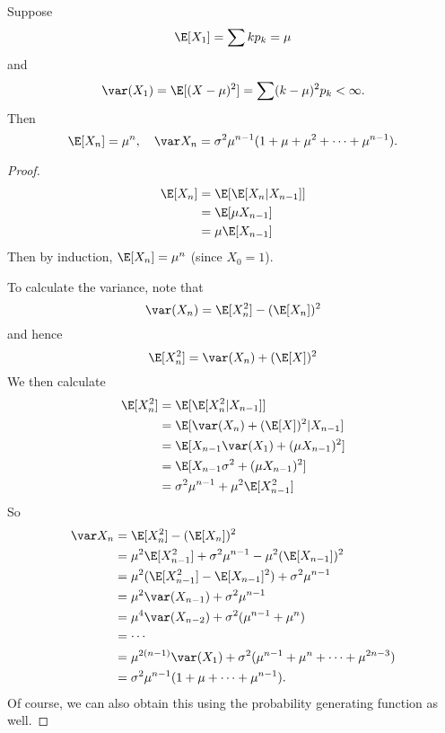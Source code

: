 \documentclass[a4paper]{article}
\begin{document}
\begin{thm}
  Suppose
  \[
    \E[X_1] = \sum k p_k = \mu
  \]
  and
  \[
    \var (X_1) = \E[(X - \mu)^2] = \sum (k - \mu)^2 p_k < \infty.
  \]
  Then
  \[
    \E[X_n] = \mu^n,\quad  \var X_n = \sigma^2\mu^{n - 1}(1 + \mu + \mu^2 + \cdots + \mu^{n - 1}).
  \]
\end{thm}
\begin{proof}
\begin{align*}
  \E[X_n] &= \E[\E[X_n|X_{n - 1}]]\\
  &= \E[\mu X_{n - 1}]\\
  &= \mu \E[X_{n - 1}]
\end{align*}
Then by induction, $\E[X_n] = \mu^n$ (since $X_0 = 1$).

To calculate the variance, note that
\[
  \var (X_n) = \E[X_n^2] - (\E[X_n])^2
\]
and hence
\[
  \E[X_n^2] = \var(X_n) + (\E[X])^2
\]
We then calculate
\begin{align*}
  \E[X_n^2] &= \E[\E[X_n^2|X_{n - 1}]]\\
  &= \E[\var(X_n) + (\E[X])^2 | X_{n - 1}]\\
  &= \E[X_{n - 1}\var (X_1) + (\mu X_{n - 1})^2]\\
  &= \E[X_{n - 1}\sigma^2 + (\mu X_{n - 1})^2]\\
  &= \sigma^2 \mu^{n - 1} + \mu^2 \E[X_{n - 1}^2]
\end{align*}
So
\begin{align*}
  \var X_n &= \E[X_n^2] - (\E[X_n])^2 \\
  &= \mu^2 \E[X_{n -1}^2] + \sigma^2 \mu^{n - 1} - \mu^2 (\E[X_{n - 1}])^2\\
  &= \mu^2(\E[X_{n - 1}^2] - \E[X_{n - 1}]^2) + \sigma^2\mu^{n - 1}\\
  &= \mu^2 \var (X_{n - 1}) + \sigma^2 \mu^{n -1 }\\
  &= \mu^4 \var(X_{n - 2}) + \sigma^2(\mu^{n - 1} + \mu^n)\\
  &= \cdots\\
  &= \mu^{2(n - 1)}\var (X_1) + \sigma^2 (\mu^{n - 1} + \mu^{n} + \cdots + \mu^{2n - 3})\\
  &= \sigma^2\mu^{n - 1}(1 + \mu + \cdots + \mu^{n - 1}).
\end{align*}
Of course, we can also obtain this using the probability generating function as well.
\end{proof}
\end{document}
